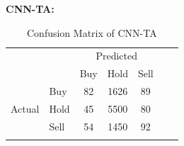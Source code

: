 \documentclass[]{article}
\begin{document}
\noindent
\textbf{CNN-TA:}
\begin{table}[H]
    \centering
    \caption{Confusion Matrix of CNN-TA}
    \begin{tabular}{llcccll}
        \cline{1-5}
        \multicolumn{1}{|l|}{} & \multicolumn{1}{l|}{} & \multicolumn{3}{c|}{Predicted} & & \\\cline{1-5} \multicolumn{1}{|l|}{} & \multicolumn{1}{l|}{} & \multicolumn{1}{l|}{Buy} & \multicolumn{1}{l|}{Hold} & \multicolumn{1}{l|}{Sell} & & \\\cline{1-5} \multicolumn{1}{|c|}{\multirow{3}{*}{Actual}} & \multicolumn{1}{l|}{Buy} & \multicolumn{1}{c|}{82} & \multicolumn{1}{c|}{1626} & \multicolumn{1}{c|}{89} & & \\\cline{2-5} \multicolumn{1}{|c|}{} & \multicolumn{1}{l|}{Hold} & \multicolumn{1}{c|}{45} & \multicolumn{1}{c|}{5500} & \multicolumn{1}{c|}{80} & & \\\cline{2-5} \multicolumn{1}{|c|}{} & \multicolumn{1}{l|}{Sell} & \multicolumn{1}{c|}{54} & \multicolumn{1}{c|}{1450} & \multicolumn{1}{c|}{92} & & \\\cline{1-5} & & \multicolumn{1}{l}{} & \multicolumn{1}{l}{} & \multicolumn{1}{l}{} & & 
    \end{tabular}
\end{table}
\end{document}
